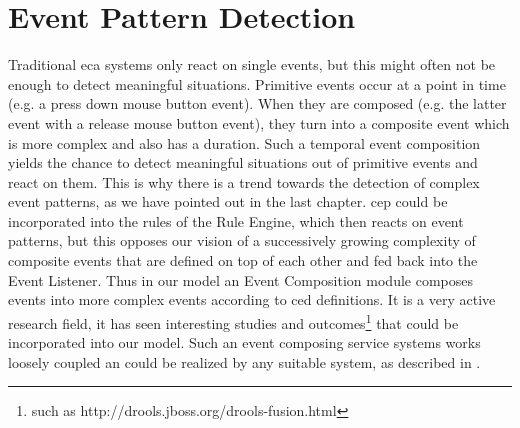\section{Event Pattern Detection}
Traditional \textrm{\acrshort{eca}} systems only react on single events, but this might often not be enough to detect meaningful situations.
Primitive events occur at a point in time (e.g. a press down mouse button event).
When they are composed (e.g. the latter event with a release mouse button event), they turn into a composite event which is more complex and also has a duration.
Such a temporal event composition yields the chance to detect meaningful situations out of primitive events and react on them.
This is why there is a trend towards the detection of complex event patterns, as we have pointed out in the last chapter.
\textrm{\acrshort{cep}} could be incorporated into the rules of the \textrm{Rule Engine}, which then reacts on event patterns, but this opposes our vision of a successively growing complexity of composite events that are defined on top of each other and fed back into the \textrm{Event Listener}.
Thus in our model an \textrm{Event Composition} module composes events into more complex events according to \textrm{\acrshort{ced}} definitions.
It is a very active research field, it has seen interesting studies\cite{akdere2008plan}\cite{2004_1265833} and outcomes\footnote{such as http://drools.jboss.org/drools-fusion.html} that could be incorporated into our model.
Such an event composing service systems works loosely coupled an could be realized by any suitable system, as described in \cite{robins2010complex}.



